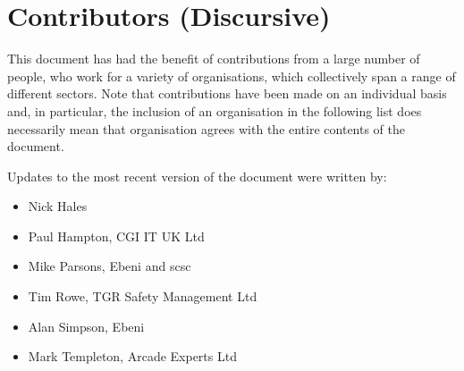 %
%
\section{Contributors (Discursive)} \label{bkm:contributors}


This document has had the benefit of contributions from a large number of people, who work for a variety of organisations, which collectively span a range of different sectors. Note that contributions  have been made on an individual basis and, in particular, the inclusion of an organisation in the following list does  necessarily mean that organisation agrees with the entire contents of the document.

Updates to the most recent version of the document were written by:
\begin{itemize}
  \item Nick Hales
  \item Paul Hampton, CGI IT UK Ltd
  \item Mike Parsons, Ebeni and \gls{scsc}
  \item Tim Rowe, TGR Safety Management Ltd
  \item Alan Simpson, Ebeni
  \item Mark Templeton, Arcade Experts Ltd
\end{itemize}

  
